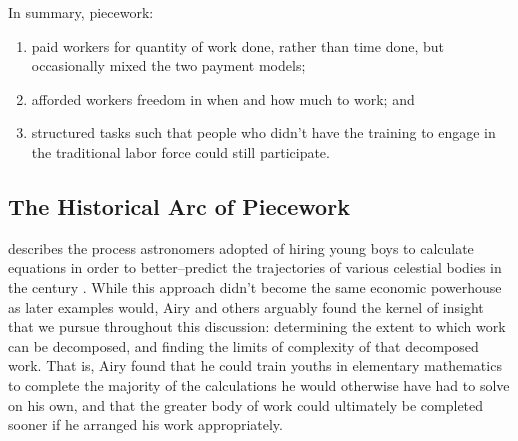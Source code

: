 \documentclass[trackingWork]{subfiles}
\begin{document}
In summary, piecework:
\begin{enumerate}
  \item paid workers for quantity of work done, rather than time done, but occasionally mixed the two payment models;
  \item afforded workers freedom in when and how much to work; and
  \item structured tasks such that people who didn't have the training to engage in the traditional labor force could still participate.
\end{enumerate}



\subsection{The Historical Arc of Piecework}\label{sec:pieceworkArc}

\citeauthor{grier2013computers} describes the process astronomers adopted of hiring young boys
to calculate equations in order
to better--predict the trajectories of various celestial bodies in the  century
\cite{grier2013computers}.
While this approach didn't become the same economic powerhouse as later examples would,
Airy  and others arguably found the kernel of insight that we pursue throughout this discussion:
determining the extent to which work can be decomposed, and
finding the limits of complexity of that decomposed work.
That is, Airy found that he could train youths in elementary mathematics
to complete the majority of the calculations he would otherwise have had to solve on his own,
and that the greater body of work could ultimately be completed sooner
if he arranged his work appropriately.



\end{document}
